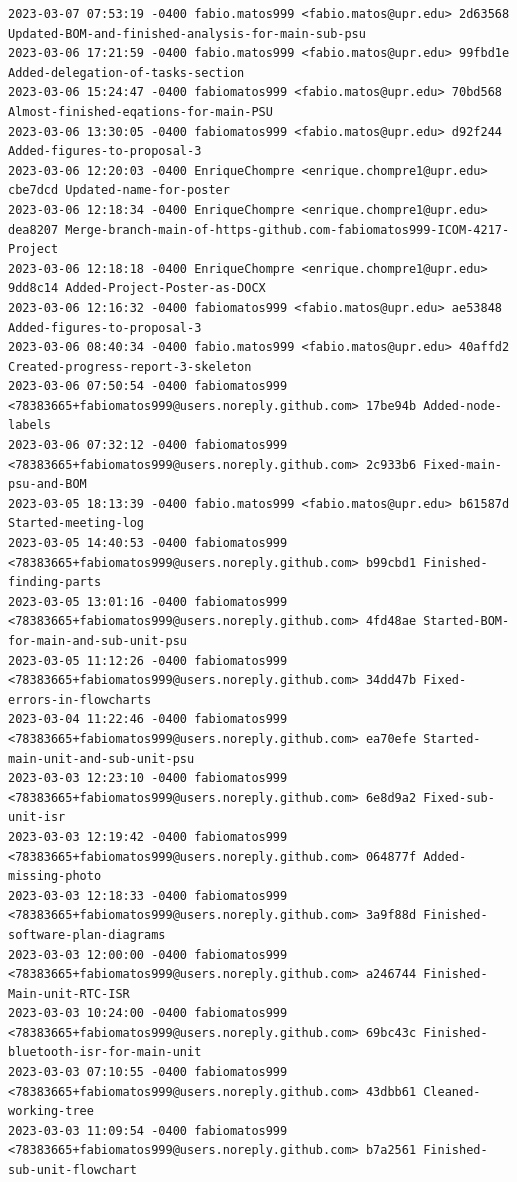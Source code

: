 \documentclass[12pt]{article}
\begin{document}
\begin{lstlisting}
2023-03-07 07:53:19 -0400 fabio.matos999 <fabio.matos@upr.edu> 2d63568 Updated-BOM-and-finished-analysis-for-main-sub-psu
2023-03-06 17:21:59 -0400 fabio.matos999 <fabio.matos@upr.edu> 99fbd1e Added-delegation-of-tasks-section
2023-03-06 15:24:47 -0400 fabiomatos999 <fabio.matos@upr.edu> 70bd568 Almost-finished-eqations-for-main-PSU
2023-03-06 13:30:05 -0400 fabiomatos999 <fabio.matos@upr.edu> d92f244 Added-figures-to-proposal-3
2023-03-06 12:20:03 -0400 EnriqueChompre <enrique.chompre1@upr.edu> cbe7dcd Updated-name-for-poster
2023-03-06 12:18:34 -0400 EnriqueChompre <enrique.chompre1@upr.edu> dea8207 Merge-branch-main-of-https-github.com-fabiomatos999-ICOM-4217-Project
2023-03-06 12:18:18 -0400 EnriqueChompre <enrique.chompre1@upr.edu> 9dd8c14 Added-Project-Poster-as-DOCX
2023-03-06 12:16:32 -0400 fabiomatos999 <fabio.matos@upr.edu> ae53848 Added-figures-to-proposal-3
2023-03-06 08:40:34 -0400 fabio.matos999 <fabio.matos@upr.edu> 40affd2 Created-progress-report-3-skeleton
2023-03-06 07:50:54 -0400 fabiomatos999 <78383665+fabiomatos999@users.noreply.github.com> 17be94b Added-node-labels
2023-03-06 07:32:12 -0400 fabiomatos999 <78383665+fabiomatos999@users.noreply.github.com> 2c933b6 Fixed-main-psu-and-BOM
2023-03-05 18:13:39 -0400 fabio.matos999 <fabio.matos@upr.edu> b61587d Started-meeting-log
2023-03-05 14:40:53 -0400 fabiomatos999 <78383665+fabiomatos999@users.noreply.github.com> b99cbd1 Finished-finding-parts
2023-03-05 13:01:16 -0400 fabiomatos999 <78383665+fabiomatos999@users.noreply.github.com> 4fd48ae Started-BOM-for-main-and-sub-unit-psu
2023-03-05 11:12:26 -0400 fabiomatos999 <78383665+fabiomatos999@users.noreply.github.com> 34dd47b Fixed-errors-in-flowcharts
2023-03-04 11:22:46 -0400 fabiomatos999 <78383665+fabiomatos999@users.noreply.github.com> ea70efe Started-main-unit-and-sub-unit-psu
2023-03-03 12:23:10 -0400 fabiomatos999 <78383665+fabiomatos999@users.noreply.github.com> 6e8d9a2 Fixed-sub-unit-isr
2023-03-03 12:19:42 -0400 fabiomatos999 <78383665+fabiomatos999@users.noreply.github.com> 064877f Added-missing-photo
2023-03-03 12:18:33 -0400 fabiomatos999 <78383665+fabiomatos999@users.noreply.github.com> 3a9f88d Finished-software-plan-diagrams
2023-03-03 12:00:00 -0400 fabiomatos999 <78383665+fabiomatos999@users.noreply.github.com> a246744 Finished-Main-unit-RTC-ISR
2023-03-03 10:24:00 -0400 fabiomatos999 <78383665+fabiomatos999@users.noreply.github.com> 69bc43c Finished-bluetooth-isr-for-main-unit
2023-03-03 07:10:55 -0400 fabiomatos999 <78383665+fabiomatos999@users.noreply.github.com> 43dbb61 Cleaned-working-tree
2023-03-03 11:09:54 -0400 fabiomatos999 <78383665+fabiomatos999@users.noreply.github.com> b7a2561 Finished-sub-unit-flowchart

\end{lstlisting}
\end{document}
